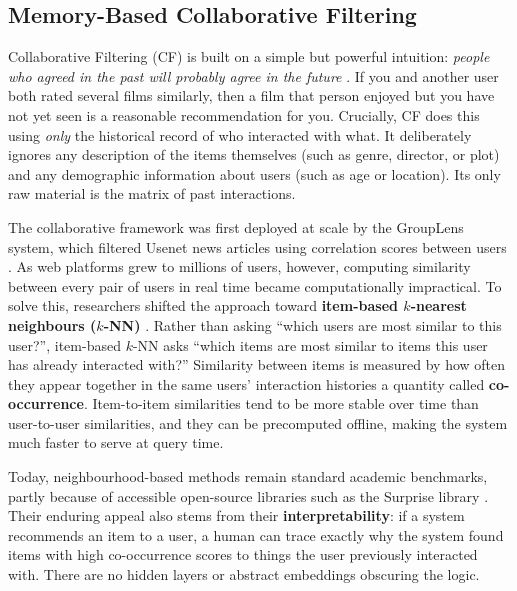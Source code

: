 \documentclass[11pt,a4paper]{report}
\begin{document}
\subsection{Memory-Based Collaborative Filtering}

Collaborative Filtering (CF) is built on a simple but powerful intuition: \emph{people who agreed in the past will probably agree in the future} \citep{adomavicius2005toward}. If you and another user both rated several films similarly, then a film that person enjoyed but you have not yet seen is a reasonable recommendation for you. Crucially, CF does this using \emph{only} the historical record of who interacted with what. It deliberately ignores any description of the items themselves (such as genre, director, or plot) and any demographic information about users (such as age or location). Its only raw material is the matrix of past interactions.

The collaborative framework was first deployed at scale by the GroupLens system, which filtered Usenet news articles using correlation scores between users \citep{resnick1994grouplens}. As web platforms grew to millions of users, however, computing similarity between every pair of users in real time became computationally impractical. To solve this, researchers shifted the approach toward \textbf{item-based $k$-nearest neighbours ($k$-NN)} \citep{sarwar2001item}. Rather than asking ``which users are most similar to this user?'', item-based $k$-NN asks ``which items are most similar to items this user has already interacted with?'' Similarity between items is measured by how often they appear together in the same users' interaction histories a quantity called \textbf{co-occurrence}. Item-to-item similarities tend to be more stable over time than user-to-user similarities, and they can be precomputed offline, making the system much faster to serve at query time.

Today, neighbourhood-based methods remain standard academic benchmarks, partly because of accessible open-source libraries such as the Surprise library \citep{hug2020surprise}. Their enduring appeal also stems from their \textbf{interpretability}: if a system recommends an item to a user, a human can trace exactly why the system found items with high co-occurrence scores to things the user previously interacted with. There are no hidden layers or abstract embeddings obscuring the logic.
\end{document}
